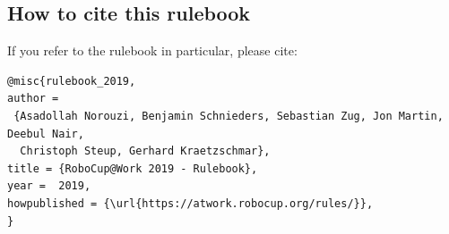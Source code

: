 \begin{titlepage}
\section*{How to cite this rulebook}

If you refer to the rulebook in particular, please cite:

\begin{verbatim}
@misc{rulebook_2019,
author =
 {Asadollah Norouzi, Benjamin Schnieders, Sebastian Zug, Jon Martin, Deebul Nair,
  Christoph Steup, Gerhard Kraetzschmar},
title = {RoboCup@Work 2019 - Rulebook},
year =  2019,
howpublished = {\url{https://atwork.robocup.org/rules/}},
}
\end{verbatim}

\end{titlepage}
